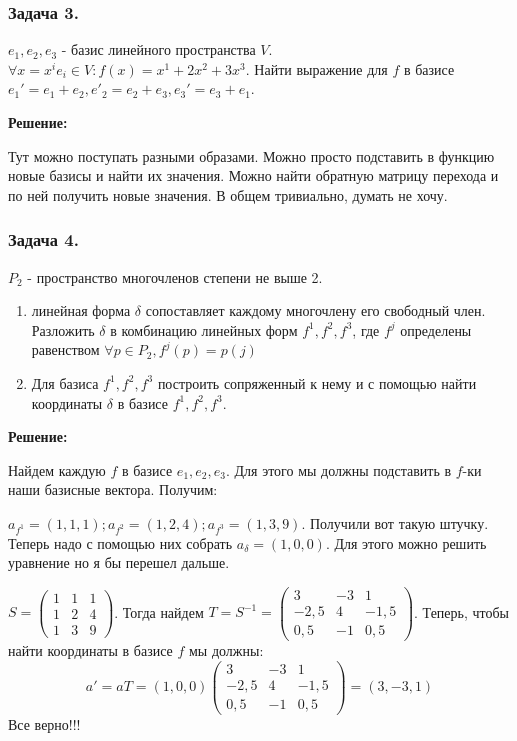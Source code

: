 \subsubsection{Задача 3.}

$e_1,e_2,e_3$ - базис линейного пространства $V$. $\forall x = x^i e_i \in V: f(x)= x^1 + 2x^2 + 3x^3$. Найти выражение для $f$ в базисе $e_1' = e_1 + e_2, e'_2 = e_2 + e_3, e_3' = e_3 + e_1$.

\textbf{Решение:}

Тут можно поступать разными образами. Можно просто подставить в функцию новые базисы и найти их значения. Можно найти обратную матрицу перехода и по ней получить новые значения. В общем тривиально, думать не хочу.

\subsubsection{Задача 4.}

$P_2$ - пространство многочленов степени не выше 2.
\begin{enumerate}
    \item линейная форма $\delta$ сопоставляет каждому многочлену его свободный член. Разложить $\delta$ в комбинацию линейных форм $f^1,f^2,f^3$, где $f^j$ определены равенством $\forall p \in P_2, f^j(p) = p(j)$
    \item Для базиса $f^1,f^2,f^3$ построить сопряженный к нему и с помощью найти координаты $\delta$ в базисе $f^1,f^2,f^3$.
\end{enumerate}

\textbf{Решение:}

Найдем каждую $f$ в базисе $e_1,e_2,e_3$. Для этого мы должны подставить в $f$-ки наши базисные вектора. Получим:

$a_{f^1} =(1, 1,1); a_{f^2}= (1,2,4); a_{f^3}=(1,3,9)$. Получили вот такую штучку. Теперь надо с помощью них собрать $a_{\delta} = (1,0,0)$. Для этого можно решить уравнение но я бы перешел дальше.

$S = \begin{pmatrix}
    1 &1&1 \\
    1&2&4\\
    1&3&9
\end{pmatrix}$. Тогда найдем $T = S^{-1}= \begin{pmatrix}
    3 & -3 & 1 \\
    -2,5 & 4 & -1,5\\
    0,5 & -1 & 0,5
\end{pmatrix}$. Теперь, чтобы найти координаты в базисе $f$ мы должны:
$$a' = a T = (1,0,0) \begin{pmatrix}
    3 & -3 & 1 \\
    -2,5 & 4 & -1,5\\
    0,5 & -1 & 0,5
\end{pmatrix} = (3,-3,1)$$
Все верно!!!

